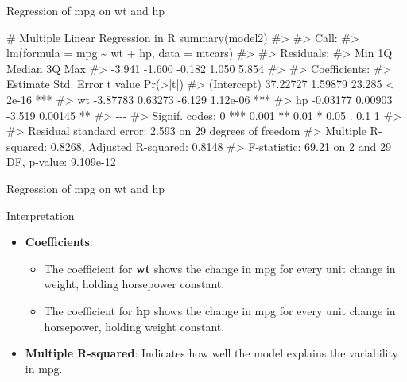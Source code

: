 \documentclass[
  18 pt,
  ignorenonframetext,
  aspectratio=1610,
]{beamer}
\newenvironment{Shaded}{\begin{snugshade}}{\end{snugshade}}
\newcommand{\CommentTok}[1]{\textcolor[rgb]{0.37,0.37,0.37}{#1}}
\newcommand{\FunctionTok}[1]{\textcolor[rgb]{0.28,0.35,0.67}{#1}}
\newcommand{\NormalTok}[1]{\textcolor[rgb]{0.00,0.23,0.31}{#1}}
\providecommand{\tightlist}{%
  \setlength{\itemsep}{0pt}\setlength{\parskip}{0pt}}\usepackage{longtable,booktabs,array}
\begin{document}
\begin{frame}[fragile]{Regression of mpg on wt and hp}
\protect\hypertarget{regression-of-mpg-on-wt-and-hp-1}{}
\tiny

\begin{Shaded}
\begin{Highlighting}[]
\CommentTok{\# Multiple Linear Regression in R}
\FunctionTok{summary}\NormalTok{(model2)}
\CommentTok{\#\textgreater{} }
\CommentTok{\#\textgreater{} Call:}
\CommentTok{\#\textgreater{} lm(formula = mpg \textasciitilde{} wt + hp, data = mtcars)}
\CommentTok{\#\textgreater{} }
\CommentTok{\#\textgreater{} Residuals:}
\CommentTok{\#\textgreater{}    Min     1Q Median     3Q    Max }
\CommentTok{\#\textgreater{} {-}3.941 {-}1.600 {-}0.182  1.050  5.854 }
\CommentTok{\#\textgreater{} }
\CommentTok{\#\textgreater{} Coefficients:}
\CommentTok{\#\textgreater{}             Estimate Std. Error t value Pr(\textgreater{}|t|)    }
\CommentTok{\#\textgreater{} (Intercept) 37.22727    1.59879  23.285  \textless{} 2e{-}16 ***}
\CommentTok{\#\textgreater{} wt          {-}3.87783    0.63273  {-}6.129 1.12e{-}06 ***}
\CommentTok{\#\textgreater{} hp          {-}0.03177    0.00903  {-}3.519  0.00145 ** }
\CommentTok{\#\textgreater{} {-}{-}{-}}
\CommentTok{\#\textgreater{} Signif. codes:  0 \textquotesingle{}***\textquotesingle{} 0.001 \textquotesingle{}**\textquotesingle{} 0.01 \textquotesingle{}*\textquotesingle{} 0.05 \textquotesingle{}.\textquotesingle{} 0.1 \textquotesingle{} \textquotesingle{} 1}
\CommentTok{\#\textgreater{} }
\CommentTok{\#\textgreater{} Residual standard error: 2.593 on 29 degrees of freedom}
\CommentTok{\#\textgreater{} Multiple R{-}squared:  0.8268, Adjusted R{-}squared:  0.8148 }
\CommentTok{\#\textgreater{} F{-}statistic: 69.21 on 2 and 29 DF,  p{-}value: 9.109e{-}12}
\end{Highlighting}
\end{Shaded}

\normalsize
\end{frame}

\begin{frame}{Regression of mpg on wt and hp}
\protect\hypertarget{regression-of-mpg-on-wt-and-hp-2}{}
\begin{block}{Interpretation}
\protect\hypertarget{interpretation-1}{}
\begin{itemize}
\tightlist
\item
  \textbf{Coefficients}:

  \begin{itemize}
  \item
    The coefficient for \textbf{wt} shows the change in mpg for every
    unit change in weight, holding horsepower constant.
  \item
    The coefficient for \textbf{hp} shows the change in mpg for every
    unit change in horsepower, holding weight constant.
  \end{itemize}
\item
  \textbf{Multiple R-squared}: Indicates how well the model explains the
  variability in mpg.
\end{itemize}
\end{block}
\end{frame}
\end{document}
